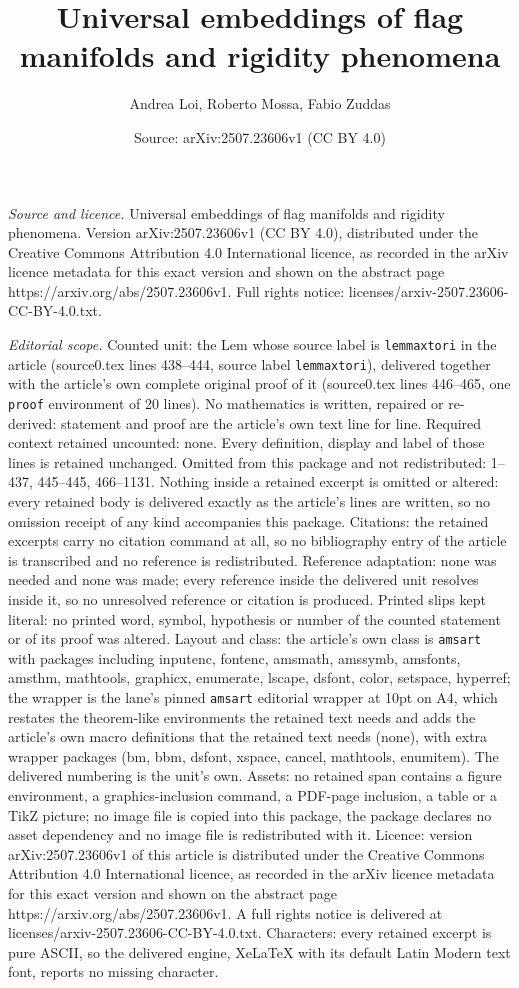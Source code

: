 \documentclass[10pt,a4paper]{amsart}
\title[Universal embeddings of flag manifolds and rigidity phenomen]{Universal embeddings of flag manifolds and rigidity phenomena}
\author{Andrea Loi, Roberto Mossa, Fabio Zuddas}
\date{Source: arXiv:2507.23606v1 (CC BY 4.0)}
\begin{document}
\maketitle

\noindent\emph{Source and licence.} Universal embeddings of flag manifolds and rigidity phenomena. Version arXiv:2507.23606v1 (CC BY 4.0), distributed under the Creative Commons Attribution 4.0 International licence, as recorded in the arXiv licence metadata for this exact version and shown on the abstract page https://arxiv.org/abs/2507.23606v1. Full rights notice: licenses/arxiv-2507.23606-CC-BY-4.0.txt.\par\smallskip

\noindent\textit{Editorial scope.} Counted unit: the Lem whose source label is \texttt{lemmaxtori} in the article (source0.tex lines 438--444, source label \texttt{lemmaxtori}), delivered together with the article's own complete original proof of it (source0.tex lines 446--465, one \texttt{proof} environment of 20 lines). No mathematics is written, repaired or re-derived: statement and proof are the article's own text line for line. Required context retained uncounted: none. Every definition, display and label of those lines is retained unchanged. Omitted from this package and not redistributed: 1--437, 445--445, 466--1131. Nothing inside a retained excerpt is omitted or altered: every retained body is delivered exactly as the article's lines are written, so no omission receipt of any kind accompanies this package. Citations: the retained excerpts carry no citation command at all, so no bibliography entry of the article is transcribed and no reference is redistributed. Reference adaptation: none was needed and none was made; every reference inside the delivered unit resolves inside it, so no unresolved reference or citation is produced. Printed slips kept literal: no printed word, symbol, hypothesis or number of the counted statement or of its proof was altered. Layout and class: the article's own class is \texttt{amsart} with packages including inputenc, fontenc, amsmath, amssymb, amsfonts, amsthm, mathtools, graphicx, enumerate, lscape, dsfont, color, setspace, hyperref; the wrapper is the lane's pinned \texttt{amsart} editorial wrapper at 10pt on A4, which restates the theorem-like environments the retained text needs and adds the article's own macro definitions that the retained text needs (none), with extra wrapper packages (bm, bbm, dsfont, xspace, cancel, mathtools, enumitem). The delivered numbering is the unit's own. Assets: no retained span contains a figure environment, a graphics-inclusion command, a PDF-page inclusion, a table or a TikZ picture; no image file is copied into this package, the package declares no asset dependency and no image file is redistributed with it. Licence: version arXiv:2507.23606v1 of this article is distributed under the Creative Commons Attribution 4.0 International licence, as recorded in the arXiv licence metadata for this exact version and shown on the abstract page https://arxiv.org/abs/2507.23606v1. A full rights notice is delivered at licenses/arxiv-2507.23606-CC-BY-4.0.txt. Characters: every retained excerpt is pure ASCII, so the delivered engine, XeLaTeX with its default Latin Modern text font, reports no missing character.
\end{document}
